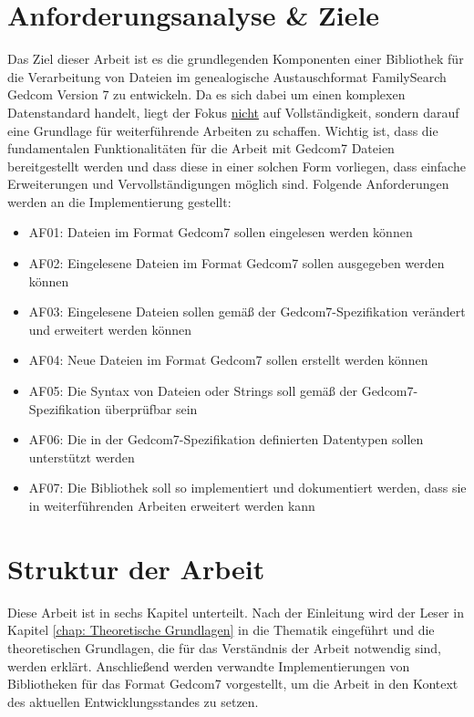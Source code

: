 \section{Anforderungsanalyse \& Ziele}
\label{sec: Anforderungsanalyse und Ziele}
Das Ziel dieser Arbeit ist es die grundlegenden Komponenten einer Bibliothek für die Verarbeitung von Dateien im genealogische Austauschformat FamilySearch Gedcom Version 7 zu entwickeln. Da es sich dabei um einen komplexen Datenstandard handelt, liegt der Fokus \underline{nicht} auf Vollständigkeit, sondern darauf eine Grundlage für weiterführende Arbeiten zu schaffen. Wichtig ist, dass die fundamentalen Funktionalitäten für die Arbeit mit Gedcom7 Dateien bereitgestellt werden und dass diese in einer solchen Form vorliegen, dass einfache Erweiterungen und Vervollständigungen möglich sind. 
\newpage
{\noindent Folgende Anforderungen werden an die Implementierung gestellt:}
\begin{itemize}
	\item AF01: Dateien im Format Gedcom7 sollen eingelesen werden können
	\item AF02: Eingelesene Dateien im  Format Gedcom7 sollen ausgegeben werden können
	\item AF03: Eingelesene Dateien sollen gemäß der Gedcom7-Spezifikation verändert und erweitert werden können
	\item AF04: Neue Dateien im Format Gedcom7 sollen erstellt werden können
	\item AF05: Die Syntax von Dateien oder Strings soll gemäß der Gedcom7-Spezifikation überprüfbar sein 
	\item AF06: Die in der Gedcom7-Spezifikation definierten Datentypen sollen unterstützt werden 
	\item AF07: Die Bibliothek soll so implementiert und dokumentiert werden, dass sie in weiterführenden Arbeiten erweitert werden kann
\end{itemize}

\section{Struktur der Arbeit}
\label{sec: Struktur der Arbeit}
Diese Arbeit ist in sechs Kapitel unterteilt. Nach der Einleitung wird der Leser in Kapitel \ref{chap: Theoretische Grundlagen} in die Thematik eingeführt und die theoretischen Grundlagen, die für das Verständnis der Arbeit notwendig sind, werden erklärt. Anschließend werden verwandte Implementierungen von Bibliotheken für das Format Gedcom7 vorgestellt, um die Arbeit in den Kontext des aktuellen Entwicklungsstandes zu setzen. 


